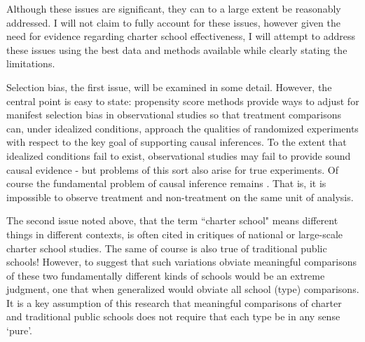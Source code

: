 \documentclass[letterpaper,12pt]{article}
\begin{document}

Although these issues are significant, they can to a large extent be reasonably addressed. I will not claim to fully account for these issues, however given the need for evidence regarding charter school effectiveness, I will attempt to address these issues using the best data and methods available while clearly stating the limitations.

Selection bias, the first issue, will be examined in some detail. However, the central point is easy to state: propensity score methods provide ways to adjust for manifest selection bias in observational studies so that treatment comparisons can, under idealized conditions, approach the qualities of randomized experiments with respect to the key goal of supporting causal inferences. To the extent that idealized conditions fail to exist, observational studies may fail to provide sound causal evidence - but problems of this sort also arise for true experiments. Of course the fundamental problem of causal inference remains \cite{Holland1986}. That is, it is impossible to observe treatment and non-treatment on the same unit of analysis.

The second issue noted above, that the term ``charter school" means different things in different contexts, is often cited in critiques of national or large-scale charter school studies. The same of course is also true of traditional public schools! However, to suggest that such variations obviate meaningful comparisons of these two fundamentally different kinds of schools would be an extreme judgment, one that when generalized would obviate all school (type) comparisons. It is a key assumption of this research that meaningful comparisons of charter and traditional public schools does not require that each type be in any sense `pure'.
\end{document}
